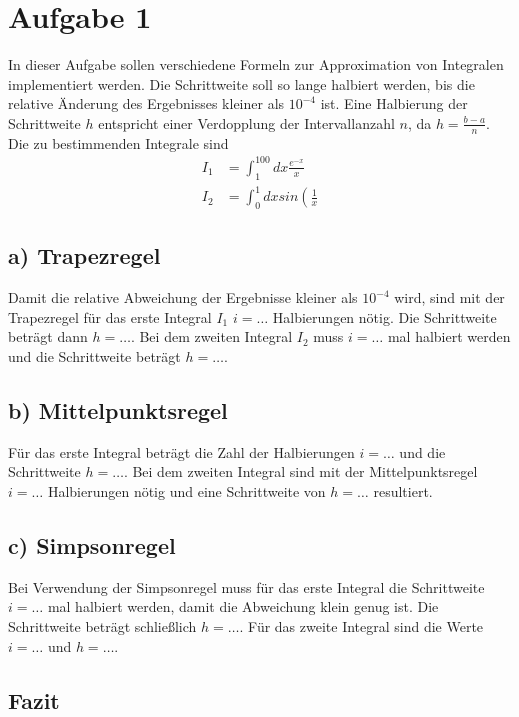 \section*{Aufgabe 1}

In dieser Aufgabe sollen verschiedene Formeln zur Approximation von Integralen implementiert werden.
Die Schrittweite soll so lange halbiert werden, bis die relative Änderung des Ergebnisses kleiner als $10^{-4}$ ist.
Eine Halbierung der Schrittweite $h$ entspricht einer Verdopplung der Intervallanzahl $n$, da $h = \frac{b-a}{n}$.
\newline
Die zu bestimmenden Integrale sind
\begin{align*}
    I_1 &= \int_{1}^{100} dx \frac{e^{-x}}{x} \\
    I_2 &= \int_{0}^{1} dx sin \left( \frac{1}{x} \right.
\end{align*}


\subsection*{a) Trapezregel}
Damit die relative Abweichung der Ergebnisse kleiner als $10^{-4}$ wird, sind mit der Trapezregel für das erste Integral $I_1$ $i = \dots$ Halbierungen nötig. Die Schrittweite beträgt dann $h = \dots$.
\newline
Bei dem zweiten Integral $I_2$ muss $i = \dots$ mal halbiert werden und die Schrittweite beträgt $h = \dots$.

\subsection*{b) Mittelpunktsregel}
Für das erste Integral beträgt die Zahl der Halbierungen $i = \dots$ und die Schrittweite $h = \dots$.
\newline
Bei dem zweiten Integral sind mit der Mittelpunktsregel $i = \dots$ Halbierungen nötig und eine Schrittweite von $h = \dots$ resultiert.

\subsection*{c) Simpsonregel}
Bei Verwendung der Simpsonregel muss für das erste Integral die Schrittweite $i = \dots$ mal halbiert werden, damit die Abweichung klein genug ist. Die Schrittweite beträgt schließlich $h = \dots$.
\newline
Für das zweite Integral sind die Werte $i = \dots$ und $h = \dots$.

\subsection*{Fazit}